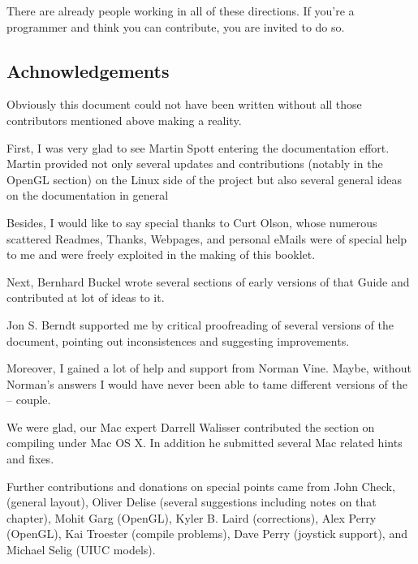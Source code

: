 There are already people working in all of these directions. If you're a programmer and
think you can contribute, you are invited to do so.

\subsection*{Achnowledgements}
Obviously this document could not have been written without all those contributors
mentioned above making \FlightGear{} a reality.

First, I was very glad to see Martin Spott  entering the documentation effort. Martin provided not only several updates and contributions (notably in the OpenGL section) on the Linux side of the project but also several general ideas on the documentation in general

Besides, I would like to say special thanks to Curt Olson, whose
numerous scattered Readmes, Thanks, Webpages, and personal eMails were of special help to
me and were freely exploited in the making of this booklet.

Next, Bernhard Buckel  wrote several sections of early versions
of that Guide and contributed at lot of ideas to it.

Jon S. Berndt  supported me by critical proofreading of several
versions of the document, pointing out inconsistences and suggesting improvements.

Moreover, I gained a lot of help and support from Norman Vine. Maybe,
without Norman's answers I would have never been able to tame different versions of the
\Cygwin{} -- \FlightGear{} couple.

We were glad, our Mac expert Darrell Walisser  contributed the section on compiling under Mac OS X. In addition he submitted several Mac related hints and fixes.

Further contributions and donations on special points came from John Check, (general layout), Oliver Delise  (several suggestions
including notes on that chapter), Mohit Garg  (OpenGL), Kyler B. Laird
 (corrections), Alex Perry (OpenGL), Kai
Troester (compile problems), Dave Perry  (joystick support), and Michael Selig (UIUC models).

